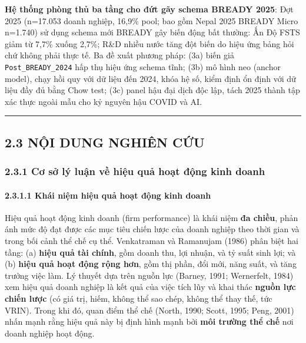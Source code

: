 \documentclass[12pt,a4paper]{article}
\begin{document}
\textbf{Hệ thống phòng thủ ba tầng cho đứt gãy schema BREADY 2025}: Đợt
2025 (n=17.053 doanh nghiệp, 16,9\% pool; bao gồm Nepal 2025 BREADY
Micro n=1.740) sử dụng schema mới BREADY gây biến động bất thường: Ấn Độ
FSTS giảm từ 7,7\% xuống 2,7\%; R\&D nhiều nước tăng đột biến do hiệu
ứng bảng hỏi chứ không phải thực tế. Ba đề xuất phương pháp: (3a) biến
giả \texttt{Post\_BREADY\_2024} hấp thụ hiệu ứng schema tĩnh; (3b) mô
hình neo (anchor model), chạy hồi quy với dữ liệu đến 2024, khóa hệ số,
kiểm định ổn định với dữ liệu đầy đủ bằng Chow test; (3c) panel hậu đại
dịch độc lập, tách 2025 thành tập xác thực ngoài mẫu cho kỷ nguyên hậu
COVID và AI.

\begin{center}\rule{0.5\linewidth}{0.5pt}\end{center}

\hypertarget{23-nux1ed9i-dung-nghiuxean-cux1ee9u}{%
\subsection{2.3 NỘI DUNG NGHIÊN
CỨU}\label{23-nux1ed9i-dung-nghiuxean-cux1ee9u}}

\hypertarget{231-cux1a1-sux1edf-luxfd-luux1eadn-vux1ec1-hiux1ec7u-quux1ea3-houx1ea1t-ux111ux1ed9ng-kinh-doanh}{%
\subsubsection{2.3.1 Cơ sở lý luận về hiệu quả hoạt động kinh
doanh}\label{231-cux1a1-sux1edf-luxfd-luux1eadn-vux1ec1-hiux1ec7u-quux1ea3-houx1ea1t-ux111ux1ed9ng-kinh-doanh}}

\hypertarget{2311-khuxe1i-niux1ec7m-hiux1ec7u-quux1ea3-houx1ea1t-ux111ux1ed9ng-kinh-doanh}{%
\paragraph{2.3.1.1 Khái niệm hiệu quả hoạt động kinh
doanh}\label{2311-khuxe1i-niux1ec7m-hiux1ec7u-quux1ea3-houx1ea1t-ux111ux1ed9ng-kinh-doanh}}

Hiệu quả hoạt động kinh doanh (firm performance) là khái niệm \textbf{đa
chiều}, phản ánh mức độ đạt được các mục tiêu chiến lược của doanh
nghiệp theo thời gian và trong bối cảnh thể chế cụ thể. Venkatraman và
Ramanujam (1986) phân biệt hai tầng: (a) \textbf{hiệu quả tài chính},
gồm doanh thu, lợi nhuận, và tỷ suất sinh lợi; và (b) \textbf{hiệu quả
hoạt động rộng hơn}, gồm thị phần, đổi mới, năng suất, và tăng trưởng
việc làm. Lý thuyết dựa trên nguồn lực (Barney, 1991; Wernerfelt, 1984)
xem hiệu quả doanh nghiệp là kết quả của việc tích lũy và khai thác
\textbf{nguồn lực chiến lược} (có giá trị, hiếm, không thể sao chép,
không thể thay thế, tức VRIN). Trong khi đó, quan điểm thể chế (North,
1990; Scott, 1995; Peng, 2001) nhấn mạnh rằng hiệu quả này bị định hình
mạnh bởi \textbf{môi trường thể chế} nơi doanh nghiệp hoạt động.
\end{document}
